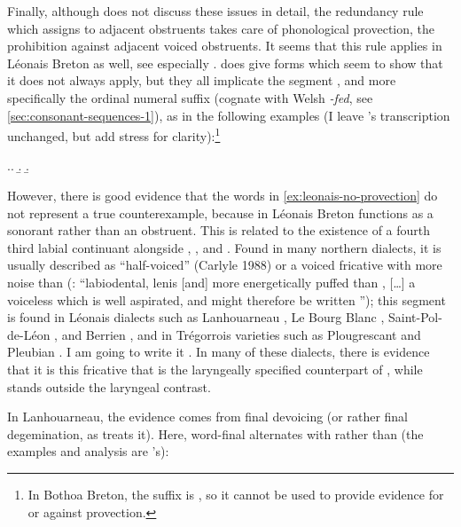 Finally, although \citet{carlyle88:_breton} does not discuss these issues in detail, the redundancy rule which assigns \ipa{[$-$voice]} to adjacent obstruents takes care of phonological provection, \ie the prohibition against adjacent voiced obstruents. It seems that this rule applies in Léonais Breton as well, see especially \citet{falchun38:_recher,falchun}. \citet{carlyle88:_breton} does give forms which seem to show that it does not always apply, but they all implicate the segment \ipa{[v]}, and more specifically the ordinal numeral suffix  (cognate with Welsh \emph{-fed}, see \cref{sec:consonant-sequences-1}), as in the following examples (I leave \citeauthor{carlyle88:_breton}'s transcription unchanged, but add stress for clarity):\footnote{In Bothoa Breton, the suffix is , so it cannot be used to provide evidence for or against provection.}

\ex.\label{ex:leonais-no-provection}\a.
\b.
\b.

However, there is good evidence that the words in \cref{ex:leonais-no-provection} do not represent a true counterexample, because \ipa{[v]} in Léonais Breton functions as a sonorant rather than an obstruent. This is related to the existence of a fourth third labial continuant alongside \ipa{[f]}, \ipa{[v]}, and \ipa{[w]}. Found in many northern dialects, it is usually described as \enquote{half-voiced} (Carlyle 1988) or a voiced fricative with more noise than \ipa{[v]} (\cf \citealt[p.~366]{plougrescant}: \enquote{labiodental, lenis [and] more energetically puffed than \ipa{[v]}, [\ldots] a voiceless \ipa{[v]} which is well aspirated, and might therefore be written \ipa{[v̥h]}}); this segment is found in Léonais dialects such as Lanhouarneau \citep{carlyle88:_breton}, Le Bourg Blanc \citep{falchun}, Saint-Pol-de-Léon \citep{st-pol-de-leon}, and Berrien \citep{ploneis}, and in Trégorrois varieties such as Plougrescant \citep{plougrescant,le78:_le_ploug} and Pleubian \citep{le96:_mutat_pleub_côtes_nord}. I am going to write it \ipa{[f̬]}. In many of these dialects, there is evidence that it is this fricative \ipa{[f̬]} that is the laryngeally specified counterpart of \ipa{[f]}, while \ipa{[v]} stands outside the laryngeal contrast.

In Lanhouarneau, the evidence comes from final devoicing (or rather final degemination, as \citealt{carlyle88:_breton} treats it). Here, word\hyp final \ipa{[f]} alternates with \ipa{[f̬]} rather than \ipa{[v]} (the examples and analysis are \citeauthor{carlyle88:_breton}'s):

